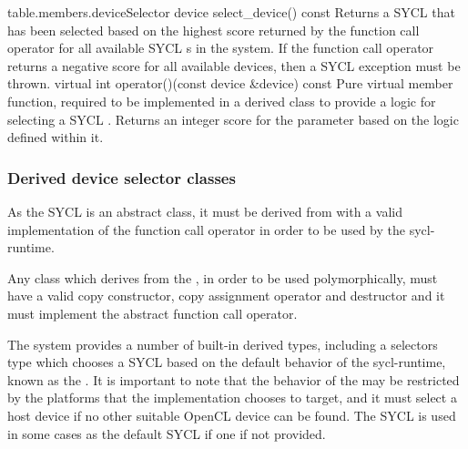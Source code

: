 
{table.members.deviceSelector}
\addRow
{device select_device() const}
{
  Returns a SYCL  that has been selected based on the highest score returned by the function call operator for all available SYCL s in the system.  If the function call operator returns a negative score for all available devices, then a  SYCL exception must be thrown.
}
\addRow
{virtual int operator()(const device \&device) const}
{
  Pure virtual member function, required to be implemented in a derived class to provide a logic for selecting a SYCL .
  Returns an integer score for the  parameter based on the logic defined within it.
}
\completeTable

\subsubsection{Derived device selector classes}

As the SYCL  is an abstract class, it must be derived from with a valid implementation of the function call operator in order to be used by the \gls{sycl-runtime}.

Any class which derives from the , in order to
be used polymorphically, must have a valid copy constructor,
copy assignment operator and destructor and it must implement the
abstract function call operator.

The system provides a number of built-in derived  types, including a selectors type which chooses a SYCL  based on the default behavior of the \gls{sycl-runtime}, known as the . It is important to note that the behavior of the  may be restricted by the platforms that the implementation chooses to target, and it must select a host device if no other suitable OpenCL device can be found. The SYCL  is used in some cases as the default SYCL  if one if not provided.

